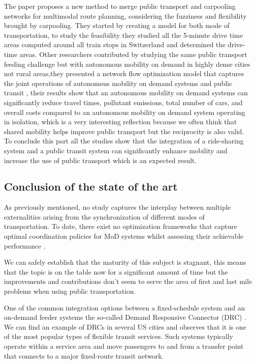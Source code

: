 \documentclass{article}
\begin{document}
The paper \citep{Huang_2019} proposes a new method to merge public transport and carpooling networks for multimodal route planning, considering the fuzziness and flexibility brought by carpooling. They started by creating a model for both mode of transportation, to study the feasibility they studied all the 5-minute drive time areas computed around all train stops in Switzerland and determined the drive-time areas. Other researchers contributed by studying the same public transport feeding challenge but with autonomous mobility on demand in highly dense cities not rural areas,they presented a network flow optimization model that captures the joint operations of  autonomous mobility on demand systems
and public transit \cite{Salazar_schiffer}, their results show that an autonomous mobility on demand systems can significantly reduce travel times, pollutant emissions, total number of cars, and overall costs compared to an  autonomous mobility on demand system operating in isolation, which is a very interesting reflection because we often think that shared mobility helps improve public transport but the reciprocity is also valid.
To conclude this part all the studies show that the integration of a ride-sharing system and a public transit system can significantly enhance mobility and increase the use of public transport which is an expected result.


\subsection{Conclusion of the state of the art}
\label{subsec:literature_part3}
 
As previously mentioned, no study captures the interplay between multiple externalities arising from the synchronization of different modes of transportation.
To date, there exist no optimization frameworks that capture optimal coordination policies for MoD systems whilst assessing their achievable performance \cite{Salazar_schiffer}.

We can safely establish that the maturity of this subject is stagnant, this means that the topic is on the table now for a significant amount of time but the improvements and contributions don\rq{t} seem to serve the area of first and last mile problems when using public transportation.

One of the common integration options between a fixed-schedule system and an on-demand feeder systems the so-called Demand Responsive Connector (DRC) \citep{STIGLIC201812}. We can find an example of DRCs in
several US cities and observes that it is one of the most popular types of flexible transit services. Such systems typically operate within a service area and move passengers to and from a transfer point that connects to a major fixed-route transit network.
\end{document}
